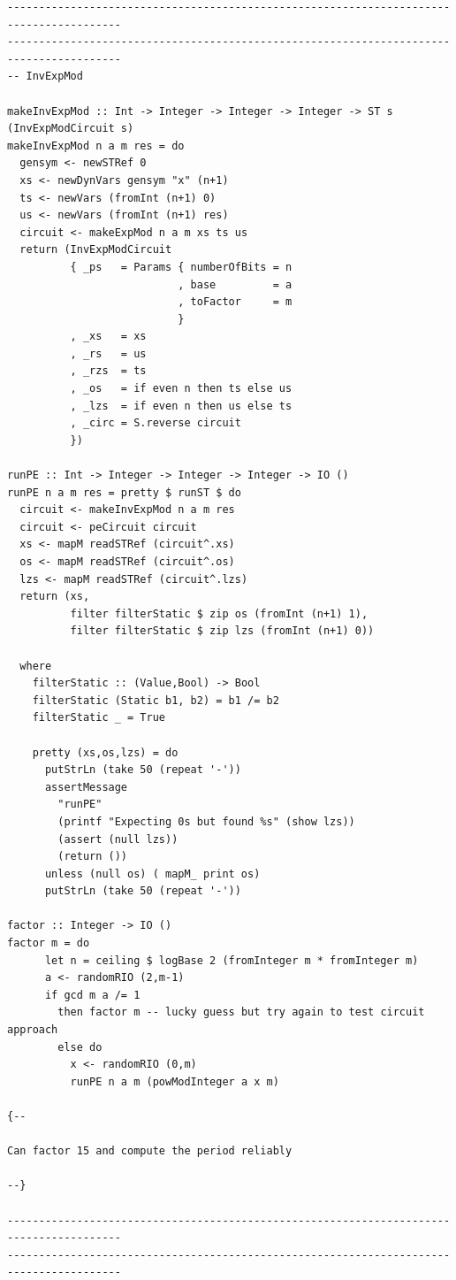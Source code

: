 \documentclass{article}
\begin{document}
\begin{verbatim}
----------------------------------------------------------------------------------------
----------------------------------------------------------------------------------------
-- InvExpMod 

makeInvExpMod :: Int -> Integer -> Integer -> Integer -> ST s (InvExpModCircuit s)
makeInvExpMod n a m res = do
  gensym <- newSTRef 0
  xs <- newDynVars gensym "x" (n+1)
  ts <- newVars (fromInt (n+1) 0)
  us <- newVars (fromInt (n+1) res)
  circuit <- makeExpMod n a m xs ts us
  return (InvExpModCircuit
          { _ps   = Params { numberOfBits = n
                           , base         = a
                           , toFactor     = m
                           }
          , _xs   = xs
          , _rs   = us
          , _rzs  = ts
          , _os   = if even n then ts else us
          , _lzs  = if even n then us else ts
          , _circ = S.reverse circuit
          })

runPE :: Int -> Integer -> Integer -> Integer -> IO ()
runPE n a m res = pretty $ runST $ do
  circuit <- makeInvExpMod n a m res 
  circuit <- peCircuit circuit
  xs <- mapM readSTRef (circuit^.xs)
  os <- mapM readSTRef (circuit^.os)
  lzs <- mapM readSTRef (circuit^.lzs)
  return (xs,
          filter filterStatic $ zip os (fromInt (n+1) 1),
          filter filterStatic $ zip lzs (fromInt (n+1) 0))

  where
    filterStatic :: (Value,Bool) -> Bool
    filterStatic (Static b1, b2) = b1 /= b2
    filterStatic _ = True
    
    pretty (xs,os,lzs) = do
      putStrLn (take 50 (repeat '-'))
      assertMessage
        "runPE"
        (printf "Expecting 0s but found %s" (show lzs))
        (assert (null lzs))
        (return ())
      unless (null os) ( mapM_ print os)
      putStrLn (take 50 (repeat '-'))

factor :: Integer -> IO ()
factor m = do
      let n = ceiling $ logBase 2 (fromInteger m * fromInteger m)
      a <- randomRIO (2,m-1)
      if gcd m a /= 1 
        then factor m -- lucky guess but try again to test circuit approach
        else do
          x <- randomRIO (0,m)
          runPE n a m (powModInteger a x m)

{--

Can factor 15 and compute the period reliably

--}

----------------------------------------------------------------------------------------
----------------------------------------------------------------------------------------

\end{verbatim}

\end{document}

